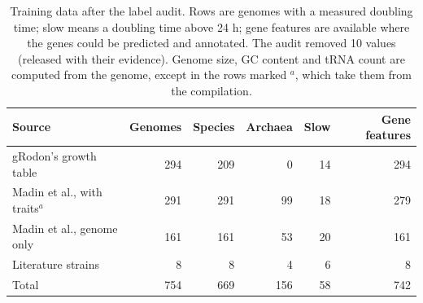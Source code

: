 \begin{table}[t]\centering\footnotesize\setlength{\tabcolsep}{3pt}
\caption{Training data after the label audit. Rows are genomes with a measured doubling time; slow means a doubling time above 24 h; gene features are available where the genes could be predicted and annotated. The audit removed 10 values (released with their evidence). Genome size, GC content and tRNA count are computed from the genome, except in the rows marked $^{a}$, which take them from the compilation.}\label{tab:data}
\begin{tabular}{lrrrrr}
\toprule
Source & Genomes & Species & Archaea & Slow & Gene features \\
\midrule
gRodon's growth table & 294 & 209 & 0 & 14 & 294 \\
Madin et al., with traits$^{a}$ & 291 & 291 & 99 & 18 & 279 \\
Madin et al., genome only & 161 & 161 & 53 & 20 & 161 \\
Literature strains & 8 & 8 & 4 & 6 & 8 \\
\midrule
Total & 754 & 669 & 156 & 58 & 742 \\
\bottomrule
\end{tabular}
\end{table}
